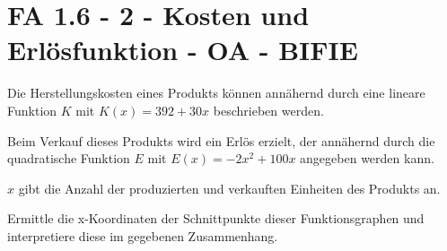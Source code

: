 \section{FA 1.6 - 2 - Kosten und Erlösfunktion - OA - BIFIE}

\begin{beispiel}[FA 1.6]{1} %
Die Herstellungskosten eines Produkts können annähernd durch eine lineare Funktion $K$ mit $K(x) = 392 + 30x$ beschrieben werden.

Beim Verkauf dieses Produkts wird ein Erlös erzielt, der annähernd durch die quadratische Funktion $E$ mit $E(x) = -2x^2 + 100x$ angegeben werden kann.

$x$ gibt die Anzahl der produzierten und verkauften Einheiten des Produkts an.


Ermittle die x-Koordinaten der Schnittpunkte dieser Funktionsgraphen und interpretiere diese im gegebenen Zusammenhang.


\end{beispiel}